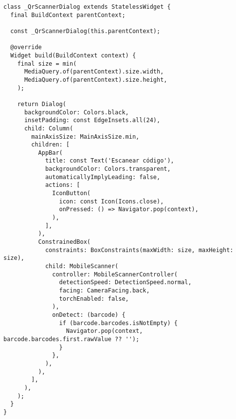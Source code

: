 \begin{verbatim}
class _QrScannerDialog extends StatelessWidget {
  final BuildContext parentContext;

  const _QrScannerDialog(this.parentContext);

  @override
  Widget build(BuildContext context) {
    final size = min(
      MediaQuery.of(parentContext).size.width,
      MediaQuery.of(parentContext).size.height,
    );

    return Dialog(
      backgroundColor: Colors.black,
      insetPadding: const EdgeInsets.all(24),
      child: Column(
        mainAxisSize: MainAxisSize.min,
        children: [
          AppBar(
            title: const Text('Escanear código'),
            backgroundColor: Colors.transparent,
            automaticallyImplyLeading: false,
            actions: [
              IconButton(
                icon: const Icon(Icons.close),
                onPressed: () => Navigator.pop(context),
              ),
            ],
          ),
          ConstrainedBox(
            constraints: BoxConstraints(maxWidth: size, maxHeight: size),
            child: MobileScanner(
              controller: MobileScannerController(
                detectionSpeed: DetectionSpeed.normal,
                facing: CameraFacing.back,
                torchEnabled: false,
              ),
              onDetect: (barcode) {
                if (barcode.barcodes.isNotEmpty) {
                  Navigator.pop(context, barcode.barcodes.first.rawValue ?? '');
                }
              },
            ),
          ),
        ],
      ),
    );
  }
}
\end{verbatim}









